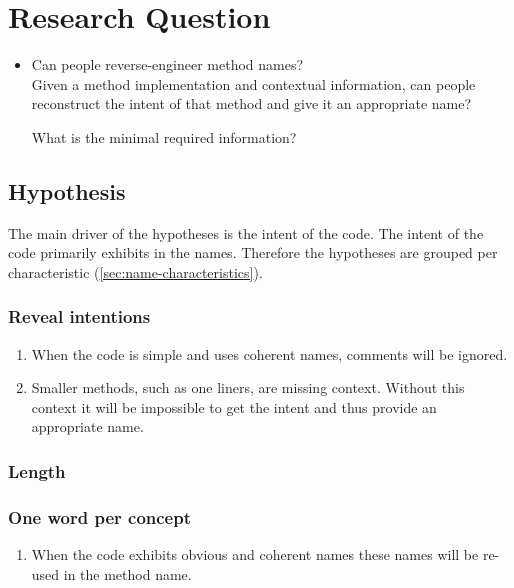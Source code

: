\section{Research Question}

\begin{itemize}	
	\item Can people reverse-engineer method names?\\
	{\small Given a method implementation and contextual information, can people reconstruct the intent of that method and give it an appropriate name?}
	
		\subitem What is the minimal required information?
\end{itemize}

\subsection{Hypothesis}

The main driver of the hypotheses is the intent of the code. The intent of the code primarily exhibits in the names. Therefore the hypotheses are grouped per characteristic (\ref{sec:name-characteristics}).


\subsubsection{Reveal intentions}
\begin{enumerate}
\item When the code is simple and uses coherent names, comments will be ignored.
\item Smaller methods, such as one liners, are missing context. Without this context it will be impossible to get the intent and thus provide an appropriate name.
\end{enumerate}

\subsubsection{Length}

\subsubsection{One word per concept}
\begin{enumerate}
\item When the code exhibits obvious and coherent names these names will be re-used in the method name.
\end{enumerate}

